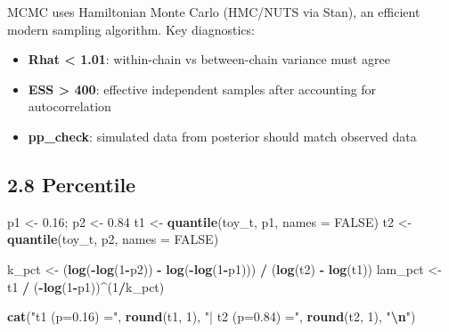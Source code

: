 \documentclass[
]{article}
\newenvironment{Shaded}{\begin{snugshade}}{\end{snugshade}}
\newcommand{\AttributeTok}[1]{\textcolor[rgb]{0.13,0.29,0.53}{#1}}
\newcommand{\ConstantTok}[1]{\textcolor[rgb]{0.56,0.35,0.01}{#1}}
\newcommand{\DecValTok}[1]{\textcolor[rgb]{0.00,0.00,0.81}{#1}}
\newcommand{\FloatTok}[1]{\textcolor[rgb]{0.00,0.00,0.81}{#1}}
\newcommand{\FunctionTok}[1]{\textcolor[rgb]{0.13,0.29,0.53}{\textbf{#1}}}
\newcommand{\NormalTok}[1]{#1}
\newcommand{\OtherTok}[1]{\textcolor[rgb]{0.56,0.35,0.01}{#1}}
\newcommand{\SpecialCharTok}[1]{\textcolor[rgb]{0.81,0.36,0.00}{\textbf{#1}}}
\newcommand{\StringTok}[1]{\textcolor[rgb]{0.31,0.60,0.02}{#1}}
\providecommand{\tightlist}{%
  \setlength{\itemsep}{0pt}\setlength{\parskip}{0pt}}
\begin{document}
MCMC uses Hamiltonian Monte Carlo (HMC/NUTS via Stan), an efficient
modern sampling algorithm. Key diagnostics:

\begin{itemize}
\tightlist
\item
  \textbf{Rhat \textless{} 1.01}: within-chain vs between-chain variance
  must agree
\item
  \textbf{ESS \textgreater{} 400}: effective independent samples after
  accounting for autocorrelation
\item
  \textbf{pp\_check}: simulated data from posterior should match
  observed data
\end{itemize}

\subsection{2.8 Percentile}\label{percentile}

\begin{Shaded}
\begin{Highlighting}[]
\NormalTok{p1 }\OtherTok{\textless{}{-}} \FloatTok{0.16}\NormalTok{; p2 }\OtherTok{\textless{}{-}} \FloatTok{0.84}
\NormalTok{t1 }\OtherTok{\textless{}{-}} \FunctionTok{quantile}\NormalTok{(toy\_t, p1, }\AttributeTok{names =} \ConstantTok{FALSE}\NormalTok{)}
\NormalTok{t2 }\OtherTok{\textless{}{-}} \FunctionTok{quantile}\NormalTok{(toy\_t, p2, }\AttributeTok{names =} \ConstantTok{FALSE}\NormalTok{)}

\NormalTok{k\_pct }\OtherTok{\textless{}{-}}\NormalTok{ (}\FunctionTok{log}\NormalTok{(}\SpecialCharTok{{-}}\FunctionTok{log}\NormalTok{(}\DecValTok{1}\SpecialCharTok{{-}}\NormalTok{p2)) }\SpecialCharTok{{-}} \FunctionTok{log}\NormalTok{(}\SpecialCharTok{{-}}\FunctionTok{log}\NormalTok{(}\DecValTok{1}\SpecialCharTok{{-}}\NormalTok{p1))) }\SpecialCharTok{/}\NormalTok{ (}\FunctionTok{log}\NormalTok{(t2) }\SpecialCharTok{{-}} \FunctionTok{log}\NormalTok{(t1))}
\NormalTok{lam\_pct }\OtherTok{\textless{}{-}}\NormalTok{ t1 }\SpecialCharTok{/}\NormalTok{ (}\SpecialCharTok{{-}}\FunctionTok{log}\NormalTok{(}\DecValTok{1}\SpecialCharTok{{-}}\NormalTok{p1))}\SpecialCharTok{\^{}}\NormalTok{(}\DecValTok{1}\SpecialCharTok{/}\NormalTok{k\_pct)}

\FunctionTok{cat}\NormalTok{(}\StringTok{"t1 (p=0.16) ="}\NormalTok{, }\FunctionTok{round}\NormalTok{(t1, }\DecValTok{1}\NormalTok{), }\StringTok{"| t2 (p=0.84) ="}\NormalTok{, }\FunctionTok{round}\NormalTok{(t2, }\DecValTok{1}\NormalTok{), }\StringTok{"}\SpecialCharTok{\textbackslash{}n}\StringTok{"}\NormalTok{)}
\end{Highlighting}
\end{Shaded}
\end{document}
